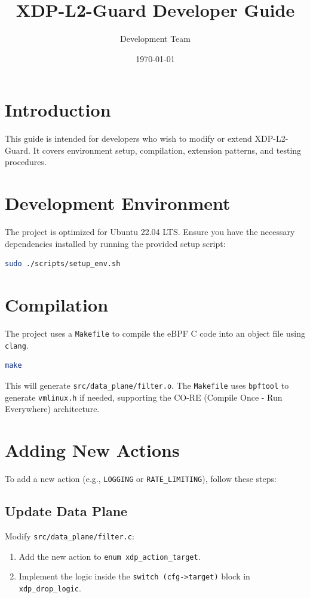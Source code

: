 \documentclass[11pt,a4paper]{report}
\title{\textbf{XDP-L2-Guard Developer Guide}}
\author{Development Team}
\date{\today}
\begin{document}
\maketitle
\tableofcontents

\chapter{Introduction}
This guide is intended for developers who wish to modify or extend XDP-L2-Guard. It covers environment setup, compilation, extension patterns, and testing procedures.

\chapter{Development Environment}

The project is optimized for Ubuntu 22.04 LTS. Ensure you have the necessary dependencies installed by running the provided setup script:

\begin{lstlisting}[language=bash]
sudo ./scripts/setup_env.sh
\end{lstlisting}

\chapter{Compilation}

The project uses a \texttt{Makefile} to compile the eBPF C code into an object file using \texttt{clang}.

\begin{lstlisting}[language=bash]
make
\end{lstlisting}

This will generate \texttt{src/data\_plane/filter.o}. The \texttt{Makefile} uses \texttt{bpftool} to generate \texttt{vmlinux.h} if needed, supporting the CO-RE (Compile Once - Run Everywhere) architecture.

\chapter{Adding New Actions}

To add a new action (e.g., \texttt{LOGGING} or \texttt{RATE\_LIMITING}), follow these steps:

\section{Update Data Plane}
Modify \texttt{src/data\_plane/filter.c}:
\begin{enumerate}
    \item Add the new action to \texttt{enum xdp\_action\_target}.
    \item Implement the logic inside the \texttt{switch (cfg->target)} block in \texttt{xdp\_drop\_logic}.
\end{enumerate}
\end{document}
